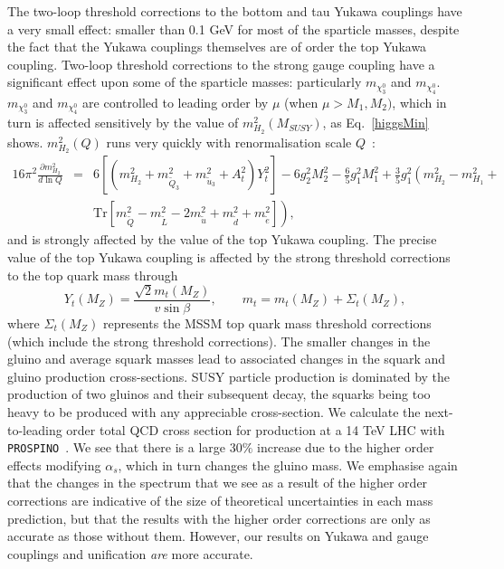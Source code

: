 \documentclass[final,3p,times,pdflatex]{elsarticle}
\begin{document}
The two-loop threshold corrections to the bottom and tau Yukawa couplings 
have a very small effect: smaller than 0.1 GeV for most of the sparticle
masses, despite the fact that the Yukawa couplings themselves are of order the
top Yukawa coupling. 
Two-loop threshold corrections to the strong gauge coupling have a significant
effect upon some of the sparticle masses: particularly $m_{\chi_3^0}$ and
$m_{\chi_4^0}$. 
$m_{\chi_3^0}$ and
$m_{\chi_4^0}$ are controlled to leading order by $\mu$ (when $\mu>M_1, M_2)$,
which in turn is affected sensitively by the value of $m_{H_2}^2(M_{SUSY})$,
as Eq.~\ref{higgsMin} shows. $m_{H_2}^2(Q)$ runs very quickly with
renormalisation scale $Q$~\cite{Martin:1993zk}:
 \begin{eqnarray}
16 \pi^2\frac{\partial m_{H_2}^2}{d \ln Q} &=& 
6 \left[ (m_{H_2}^2 + m_{{\tilde Q}_3}^2 +
  m_{{\tilde u}_3}^2 + A_t^2)  Y_t^2  \right] - 6 g_2^2 M_2^2 - \frac{6}{5}
g_1^2 M_1^2 + \frac{3}{5}
g_1^2 \left(m_{H_2}^2-m_{H_1}^2 + \right. \nonumber \\
&&\left. \mbox{Tr}[m_{\tilde Q}^2 - m_{\tilde L}^2 - 2 
m_{\tilde u}^2 + m_{\tilde d}^2 + m_{\tilde e}^2] \right), \label{rgesA}
\end{eqnarray}
and is strongly affected by the value of the 
top Yukawa coupling.
The precise value of the top Yukawa coupling is affected by the strong
threshold corrections to the top quark mass
through~\cite{Pierce:1996zz}
\begin{equation}
Y_t(M_Z) = \frac{\sqrt{2} m_t(M_Z)}{v \sin \beta}, \qquad 
m_t = m_t(M_Z) + \Sigma_t(M_Z),
\end{equation}
where $\Sigma_t(M_Z)$ represents the MSSM top quark mass threshold corrections
(which include the strong threshold corrections).
The smaller changes in the gluino and average squark masses lead to associated
changes in the squark and gluino production cross-sections. 
SUSY particle production is dominated by the production of two gluinos and
their subsequent decay, the squarks being too heavy to be produced with any
appreciable cross-section. We calculate the next-to-leading order total QCD
cross section for production at a 14 TeV LHC with {\tt
  PROSPINO}~\cite{Beenakker:1996ed,Beenakker:1996ch}. We see that there is
a large 30$\%$ increase due to the higher order effects modifying $\alpha_s$,
which in turn changes the gluino mass. We emphasise again that the changes in
the 
spectrum that we see as a result of the higher order corrections are
indicative of the size of theoretical uncertainties in 
each mass prediction, but that the results with the higher order corrections
are only as accurate as those without them. 
However, our results on Yukawa and gauge couplings and unification {\em are}
more accurate. 
\end{document}
